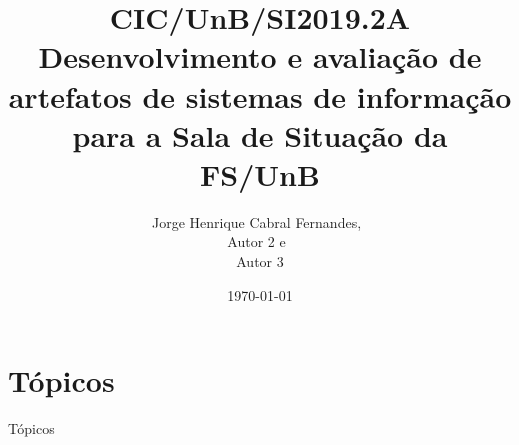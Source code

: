 \documentclass{beamer}
\title{CIC/UnB/SI2019.2A\\ Desenvolvimento e avaliação de artefatos de sistemas de informação para a Sala de Situação da FS/UnB}
\author{Jorge Henrique Cabral Fernandes,\ \\Autor 2 e\ \\Autor 3}
\date{\today}
\begin{document}

\frame{\titlepage}

\section[Visão Geral]{Tópicos}
\begin{frame}{Tópicos}
  \tableofcontents
\end{frame}


\end{document}
